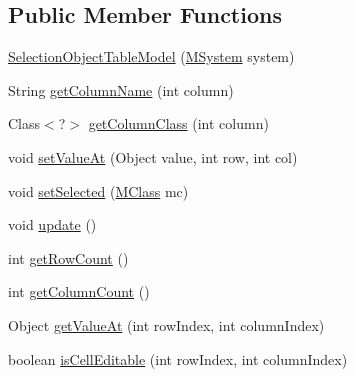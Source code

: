 \subsection*{Public Member Functions}
\begin{DoxyCompactItemize}
\item 
\hyperlink{classorg_1_1tzi_1_1use_1_1gui_1_1views_1_1selection_1_1objectselection_1_1_selection_object_table_model_a5a0b6348b739a3a5b0b632d2dda42c28}{Selection\-Object\-Table\-Model} (\hyperlink{classorg_1_1tzi_1_1use_1_1uml_1_1sys_1_1_m_system}{M\-System} system)
\item 
String \hyperlink{classorg_1_1tzi_1_1use_1_1gui_1_1views_1_1selection_1_1objectselection_1_1_selection_object_table_model_a6de195254a686aca06b3dd006bbec8b0}{get\-Column\-Name} (int column)
\item 
Class$<$?$>$ \hyperlink{classorg_1_1tzi_1_1use_1_1gui_1_1views_1_1selection_1_1objectselection_1_1_selection_object_table_model_a7c3e929dcee54d9d7ec5130a84acd7e6}{get\-Column\-Class} (int column)
\item 
void \hyperlink{classorg_1_1tzi_1_1use_1_1gui_1_1views_1_1selection_1_1objectselection_1_1_selection_object_table_model_adee4009182f95ecec8ed513c3b62b19b}{set\-Value\-At} (Object value, int row, int col)
\item 
void \hyperlink{classorg_1_1tzi_1_1use_1_1gui_1_1views_1_1selection_1_1objectselection_1_1_selection_object_table_model_ae5e6c213fa217a1afdbf67bc3aa2740d}{set\-Selected} (\hyperlink{interfaceorg_1_1tzi_1_1use_1_1uml_1_1mm_1_1_m_class}{M\-Class} mc)
\item 
void \hyperlink{classorg_1_1tzi_1_1use_1_1gui_1_1views_1_1selection_1_1objectselection_1_1_selection_object_table_model_a7e60a62c9b88262f17d27f880c0155a5}{update} ()
\item 
int \hyperlink{classorg_1_1tzi_1_1use_1_1gui_1_1views_1_1selection_1_1objectselection_1_1_selection_object_table_model_a7ced42625eeee640b60ce4b84970e7a8}{get\-Row\-Count} ()
\item 
int \hyperlink{classorg_1_1tzi_1_1use_1_1gui_1_1views_1_1selection_1_1objectselection_1_1_selection_object_table_model_aa18efb1f60d88432a651d2ed4a78b82f}{get\-Column\-Count} ()
\item 
Object \hyperlink{classorg_1_1tzi_1_1use_1_1gui_1_1views_1_1selection_1_1objectselection_1_1_selection_object_table_model_a76f2da709b6f13bdffb98d69b81d82b1}{get\-Value\-At} (int row\-Index, int column\-Index)
\item 
boolean \hyperlink{classorg_1_1tzi_1_1use_1_1gui_1_1views_1_1selection_1_1objectselection_1_1_selection_object_table_model_acfd4f9589b1604984df47201c57e80cc}{is\-Cell\-Editable} (int row\-Index, int column\-Index)

\end{DoxyCompactItemize}
